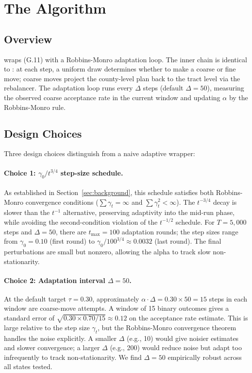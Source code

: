 \section{The \ams{} Algorithm}
\label{sec:algorithm}

\subsection{Overview}

\ams{} wraps \ms{} (G.11) with a Robbins-Monro adaptation loop.
The inner chain is identical to \ms{}: at each step, a uniform draw determines
whether to make a coarse or fine move; coarse moves project the county-level
plan back to the tract level via the rebalancer.
The adaptation loop runs every $\Delta$ steps (default $\Delta = 50$),
measuring the observed coarse acceptance rate in the current window and
updating $\alpha$ by the Robbins-Monro rule.

\subsection{Design Choices}

Three design choices distinguish \ams{} from a naive adaptive wrapper:

\paragraph{Choice 1: $\gamma_0/t^{3/4}$ step-size schedule.}
As established in Section~\ref{sec:background}, this schedule satisfies both
Robbins-Monro convergence conditions ($\sum \gamma_t = \infty$ and $\sum
\gamma_t^2 < \infty$).
The $t^{-3/4}$ decay is slower than the $t^{-1}$ alternative, preserving
adaptivity into the mid-run phase, while avoiding the second-condition
violation of the $t^{-1/2}$ schedule.
For $T = 5{,}000$ steps and $\Delta = 50$, there are $t_{\max} = 100$
adaptation rounds; the step sizes range from $\gamma_0 = 0.10$ (first round)
to $\gamma_0/100^{3/4} \approx 0.0032$ (last round).
The final perturbations are small but nonzero, allowing the alpha to track
slow non-stationarity.

\paragraph{Choice 2: Adaptation interval $\Delta = 50$.}
At the default target $\tau = 0.30$, approximately $\alpha \cdot \Delta = 0.30
\times 50 = 15$ steps in each window are coarse-move attempts.
A window of 15 binary outcomes gives a standard error of
$\sqrt{0.30 \times 0.70 / 15} \approx 0.12$ on the acceptance rate estimate.
This is large relative to the step size $\gamma_t$, but the Robbins-Monro
convergence theorem handles the noise explicitly.
A smaller $\Delta$ (e.g., 10) would give noisier estimates and slower
convergence; a larger $\Delta$ (e.g., 200) would reduce noise but adapt too
infrequently to track non-stationarity.
We find $\Delta = 50$ empirically robust across all states tested.


